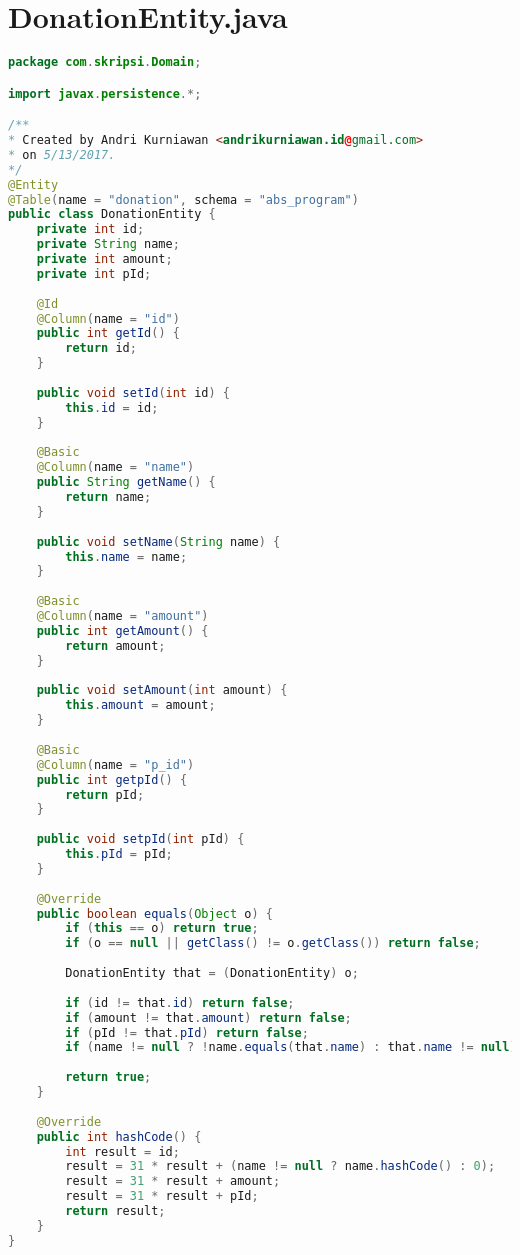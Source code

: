 \newpage
\section*{DonationEntity.java}
\begin{lstlisting}[caption={Berkas DonationEntity.java},label={lst:DonationEntity},language=Java]
package com.skripsi.Domain;

import javax.persistence.*;

/**
* Created by Andri Kurniawan <andrikurniawan.id@gmail.com>
* on 5/13/2017.
*/
@Entity
@Table(name = "donation", schema = "abs_program")
public class DonationEntity {
	private int id;
	private String name;
	private int amount;
	private int pId;
	
	@Id
	@Column(name = "id")
	public int getId() {
		return id;
	}
	
	public void setId(int id) {
		this.id = id;
	}
	
	@Basic
	@Column(name = "name")
	public String getName() {
		return name;
	}
	
	public void setName(String name) {
		this.name = name;
	}
	
	@Basic
	@Column(name = "amount")
	public int getAmount() {
		return amount;
	}
	
	public void setAmount(int amount) {
		this.amount = amount;
	}
	
	@Basic
	@Column(name = "p_id")
	public int getpId() {
		return pId;
	}
	
	public void setpId(int pId) {
		this.pId = pId;
	}
	
	@Override
	public boolean equals(Object o) {
		if (this == o) return true;
		if (o == null || getClass() != o.getClass()) return false;
		
		DonationEntity that = (DonationEntity) o;
		
		if (id != that.id) return false;
		if (amount != that.amount) return false;
		if (pId != that.pId) return false;
		if (name != null ? !name.equals(that.name) : that.name != null) return false;
		
		return true;
	}
	
	@Override
	public int hashCode() {
		int result = id;
		result = 31 * result + (name != null ? name.hashCode() : 0);
		result = 31 * result + amount;
		result = 31 * result + pId;
		return result;
	}
}

\end{lstlisting}

\newpage
